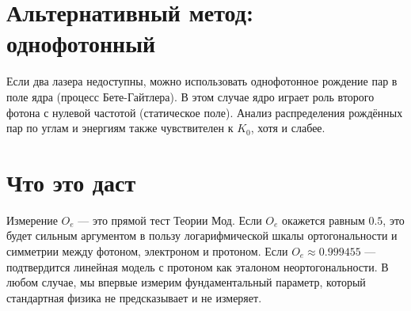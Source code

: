 \documentclass[12pt,a4paper]{article}
\begin{document}
\section{Альтернативный метод: однофотонный}
Если два лазера недоступны, можно использовать однофотонное рождение пар в поле ядра (процесс Бете-Гайтлера). В этом случае ядро играет роль второго фотона с нулевой частотой (статическое поле). Анализ распределения рождённых пар по углам и энергиям также чувствителен к $K_0$, хотя и слабее.

\section{Что это даст}
Измерение $O_e$ — это прямой тест Теории Мод. Если $O_e$ окажется равным $0.5$, это будет сильным аргументом в пользу логарифмической шкалы ортогональности и симметрии между фотоном, электроном и протоном. Если $O_e \approx 0.999455$ — подтвердится линейная модель с протоном как эталоном неортогональности. В любом случае, мы впервые измерим фундаментальный параметр, который стандартная физика не предсказывает и не измеряет.
\end{document}
